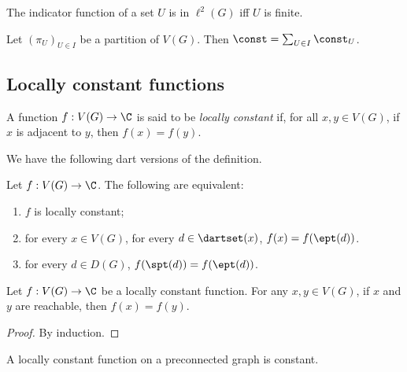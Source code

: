 \begin{lemma}
  \label{lem:indicator_ell2}
  The indicator function of a set $U$ is in $\ell^2(G)$ iff $U$ is finite.
\end{lemma}

\begin{lemma}
  \label{lem:partition_unity}
  Let $(\pi_U)_{U \in I}$ be a partition of $V(G)$. Then $\const = \sum_{U \in I} \const_U$.
\end{lemma}

\subsection{Locally constant functions}

\begin{definition}
  \label{def:locally_constant}
  A function $f : V(G) \rightarrow \C$ is said to be \emph{locally constant}
  if, for all $x,y \in V(G)$, if $x$ is adjacent to $y$, then $f(x)=f(y)$.
\end{definition}

We have the following dart versions of the definition.

\begin{lemma}
  \label{lem:dart_locally_constant}
  Let $f : V(G) \rightarrow \C$. The following are equivalent:
  \begin{enumerate}
    \item  $f$ is locally constant;
    \item for every $x \in V(G)$, for every $d \in \dartset(x)$,
    $f(x)=f(\ept(d))$.
    \item for every $d \in D(G)$, $f(\spt(d))=f(\ept(d))$.
  \end{enumerate}
\end{lemma}

\begin{lemma}
  \label{lem:locally_constant_walk}
  Let $f : V(G) \rightarrow \C$ be a locally constant function.
  For any $x, y \in V(G)$, if $x$ and $y$ are reachable, then $f(x)=f(y)$.
\end{lemma}

\begin{proof}
  By induction.
\end{proof}

\begin{lemma}
  \label{lem:locally_constant_preconnected}
  A locally constant function on a preconnected graph is constant.
\end{lemma}

